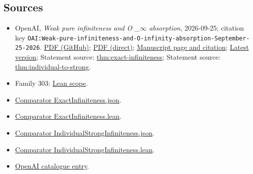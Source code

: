\documentclass[11pt]{article}
\begin{document}
\subsection{Sources}
\begin{itemize}
\item OpenAI, \emph{Weak pure infiniteness and O \_\(\infty\) absorption}, 2026-09-25; citation key \texttt{OAI:Weak-pure-infiniteness-and-O-infinity-absorption-September-25-2026}. \href{https://github.com/openai/math/blob/adc7f1241b42e322a6451854ab7e4b4c146bf78a/preprints/Weak-pure-infiniteness-and-O-infinity-absorption-September-25-2026/paper.pdf}{PDF (GitHub)}; \href{https://github.com/openai/math/raw/adc7f1241b42e322a6451854ab7e4b4c146bf78a/preprints/Weak-pure-infiniteness-and-O-infinity-absorption-September-25-2026/paper.pdf}{PDF (direct)}; \href{https://github.com/openai/math/blob/adc7f1241b42e322a6451854ab7e4b4c146bf78a/preprints/Weak-pure-infiniteness-and-O-infinity-absorption-September-25-2026/README.md}{Manuscript page and citation}; \href{https://github.com/openai/math/blob/main/preprints/Weak-pure-infiniteness-and-O-infinity-absorption-September-25-2026/paper.pdf}{Latest version}; Statement source: \href{https://github.com/openai/math/blob/adc7f1241b42e322a6451854ab7e4b4c146bf78a/preprints/Weak-pure-infiniteness-and-O-infinity-absorption-September-25-2026/build/introduction.tex\#L98}{thm:exact-infiniteness}; Statement source: \href{https://github.com/openai/math/blob/adc7f1241b42e322a6451854ab7e4b4c146bf78a/preprints/Weak-pure-infiniteness-and-O-infinity-absorption-September-25-2026/build/introduction.tex\#L73}{thm:individual-to-strong}.
\item Family 303: \href{https://github.com/openai/math/blob/adc7f1241b42e322a6451854ab7e4b4c146bf78a/lean/docs/303.md}{Lean scope}.
\item \href{https://github.com/openai/math/blob/adc7f1241b42e322a6451854ab7e4b4c146bf78a/lean/ComparatorChallenges/ExactInfiniteness.json}{Comparator ExactInfiniteness.json}.
\item \href{https://github.com/openai/math/blob/adc7f1241b42e322a6451854ab7e4b4c146bf78a/lean/ComparatorChallenges/ExactInfiniteness.lean}{Comparator ExactInfiniteness.lean}.
\item \href{https://github.com/openai/math/blob/adc7f1241b42e322a6451854ab7e4b4c146bf78a/lean/ComparatorChallenges/IndividualStrongInfiniteness.json}{Comparator IndividualStrongInfiniteness.json}.
\item \href{https://github.com/openai/math/blob/adc7f1241b42e322a6451854ab7e4b4c146bf78a/lean/ComparatorChallenges/IndividualStrongInfiniteness.lean}{Comparator IndividualStrongInfiniteness.lean}.
\item \href{https://github.com/openai/math/blob/adc7f1241b42e322a6451854ab7e4b4c146bf78a/CONTENTS.md}{OpenAI catalogue entry}.
\end{itemize}
\end{document}

